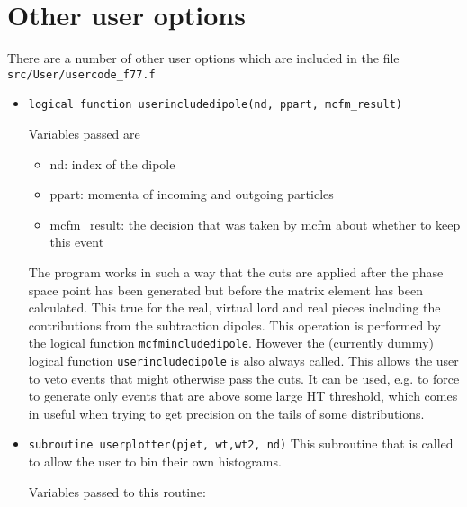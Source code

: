 \documentclass[12pt]{article}
\begin{document}
\section{Other user options}
\label{user}
There are a number of other user options which are included in the file 
{\tt src/User/usercode\_f77.f}
\begin{itemize}
\item {\tt logical function userincludedipole(nd, ppart, mcfm\_result)}

   Variables passed are                                         
\begin{itemize}                                               
\item  nd:           index of the dipole
\item ppart:        momenta of incoming and outgoing particles
\item mcfm\_result:  the decision that was taken by mcfm about whether to keep this event
\end{itemize}                                                                                                                                   

The program works in such a way that the cuts are applied after the
phase space point has been generated but before the matrix element has
been calculated. This true for the real, virtual lord and real pieces
including the contributions from the subtraction dipoles. This
operation is performed by the \MCFM logical function {\tt mcfmincludedipole}.  
However the (currently dummy) logical function {\tt userincludedipole} 
is also  always called.  This allows the user to
veto events that might otherwise pass the \MCFM cuts.  It can be used,
e.g. to force \MCFM to generate only events that are above some large
HT threshold, which comes in useful when trying to get precision on
the tails of some distributions.
                                                           
\item {\tt subroutine userplotter(pjet, wt,wt2, nd)}
This subroutine that is called to allow the user to bin their own       
histograms.                                                              
                                                                                                                                   
Variables passed to this routine:                                                                                               
                                                                                                                                   

\end{itemize}
\end{document}
